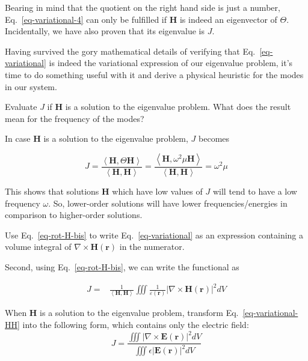 Bearing in mind that the quotient on the right hand side is just a number, Eq.~\ref{eq-variational-4} can only be fulfilled if ${\mathbf H}$ is indeed an eigenvector of $\Theta$. Incidentally, we have also proven that its eigenvalue is $J$.

Having survived the gory mathematical details of verifying that Eq.~\ref{eq-variational} is indeed the variational expression of our eigenvalue problem, it's time to do something useful with it and derive a physical heuristic for the modes in our system.

\begin{cue}
Evaluate $J$ if ${\mathbf H}$ is a solution to the eigenvalue problem. What does the result mean for the frequency of the modes?  
\end{cue}
  
In case ${\mathbf H}$ is a solution to the eigenvalue problem, $J$ becomes

\begin{equation}
J =  \frac{\left\langle {\mathbf H} , \Theta {\mathbf H}\right\rangle}{\left\langle {\mathbf H} , {\mathbf H}\right\rangle} = \frac{\left\langle {\mathbf H} , \omega^2 \mu {\mathbf H}\right\rangle}{\left\langle {\mathbf H} , {\mathbf H}\right\rangle} = \omega^2 \mu
\end{equation}

This shows that solutions ${\mathbf H}$ which have low values of $J$ will tend to have a low frequency $\omega$. So, lower-order solutions will have lower frequencies/energies in comparison to higher-order solutions.

\begin{cue}
Use Eq.~\ref{eq-rot-H-bis} to write Eq.~\ref {eq-variational} as an expression containing a volume integral of $ \nabla \times {\mathbf H({\mathbf r})}$ in the numerator.   
\end{cue}

Second, using Eq.~\ref{eq-rot-H-bis}, we can write the functional as

\begin{align}
J =& \frac{1}{\left\langle {\mathbf H} , {\mathbf H}\right\rangle}  \iiint \frac{1}{\varepsilon({\mathbf r})} \left | \nabla \times {\mathbf H({\mathbf r})} \right |^2  dV  \label{eq-variational-HH}
\end{align} 

\pagebreak

\begin{exer}
When ${\mathbf H}$ is a solution to the eigenvalue problem, transform Eq.~\ref{eq-variational-HH} into the following form, which contains only the electric field:
$$J=\frac{\iiint \left | \nabla \times {\mathbf E({\mathbf r})} \right |^2  dV} {\iiint \epsilon \left | {\mathbf E({\mathbf r})} \right |^2  dV} $$
\label{ex-eigenvalue-e}
\end{exer}


